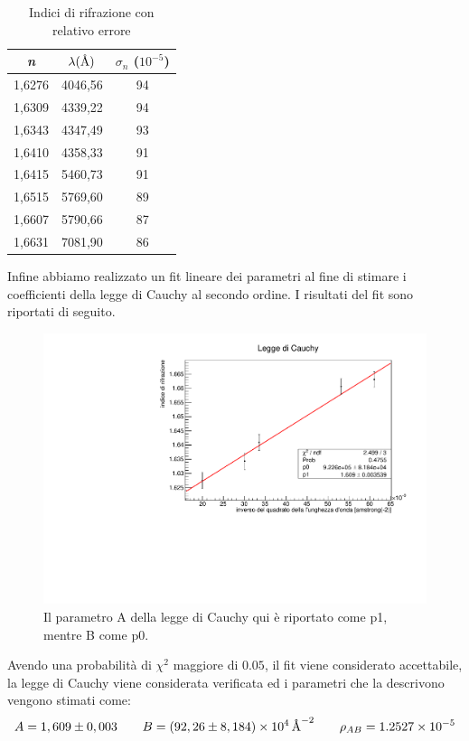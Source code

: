\begin{table}[h!]
    \centering
    \begin{tabular}{ccc}
    \toprule
    \textit{n} & $\lambda (\mbox{\normalfont\AA})$& $\sigma_n$ ($10^{-5}$)\\
    \midrule
    1,6276	&4046,56 &  94\\
    1,6309	&4339,22 &  94\\
    1,6343	&4347,49 &  93\\
    1,6410	&4358,33 &  91\\
    1,6415	&5460,73 &  91\\
    1,6515	&5769,60 &  89\\
    1,6607	&5790,66 &  87\\
    1,6631	&7081,90 &  86\\
\bottomrule
    \end{tabular}
    \caption{Indici di rifrazione con relativo errore}
\end{table}
\noindent
Infine abbiamo realizzato un fit lineare dei parametri al fine di stimare i coefficienti della legge di Cauchy al secondo ordine. I risultati del fit sono riportati di seguito.
\begin{figure}[h!]
    \centering
    \includegraphics[scale=.65]{Immagini/Legge Cauchy.pdf}
    \caption{Il parametro A della legge di Cauchy qui è riportato come p1, mentre B come p0.}
\end{figure}

\noindent
Avendo una probabilità di $\chi^2$ maggiore di $0.05$, il fit viene considerato accettabile, la legge di Cauchy viene considerata verificata ed i parametri che la descrivono vengono stimati come:
$$
A = 1,609 \pm 0,003\qquad B= (92,26\pm 8,184)\times 10^{4}\,\mbox{\normalfont\AA}^{-2}   \qquad \rho_{AB}= 1.2527\times 10^{-5}
$$